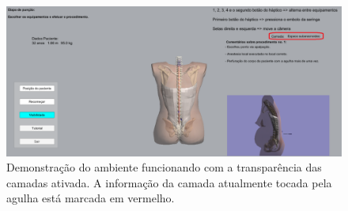 \begin{figure}[ht!]
    \centering
    \includegraphics[width=\textwidth]{capitulos/figuras/sistemaExecucaoCamadaAtual.png} 
    \caption{Demonstração do ambiente funcionando com a  transparência das camadas ativada. A informação da camada atualmente tocada pela agulha está marcada em vermelho.}
    \label{fig:sistemaExecucaoVisibilidadeCamadaAtual}
\end{figure}